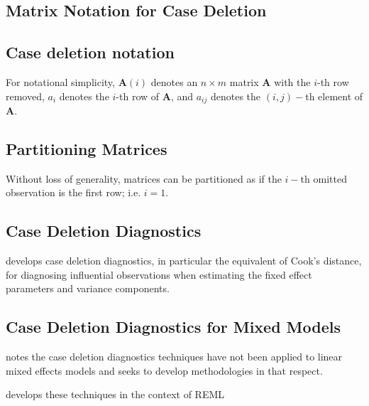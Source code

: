 \documentclass[Chap5amain.tex]{subfiles}
\begin{document}
\subsection{Matrix Notation for Case Deletion} %

\subsection{Case deletion notation} %

For notational simplicity, $\boldsymbol{A}(i)$ denotes an $n \times m$ matrix $\boldsymbol{A}$ with the $i$-th row
removed, $a_i$ denotes the $i$-th row of $\boldsymbol{A}$, and $a_{ij}$ denotes the $(i, j)-$th element of $\boldsymbol{A}$.

\subsection{Partitioning Matrices} %
Without loss of generality, matrices can be partitioned as if the $i-$th omitted observation is the first row; i.e. $i=1$.





\subsection{Case Deletion Diagnostics} %

\citet{CPJ} develops  case deletion diagnostics, in particular the equivalent of  Cook's distance, for diagnosing influential observations when estimating the fixed effect parameters and variance components.



\subsection{Case Deletion Diagnostics for Mixed Models}

\citet{Christiansen} notes the case deletion diagnostics techniques have not been applied to linear mixed effects models and seeks to develop methodologies in that respect.

\citet{Christiansen} develops these techniques in the context of REML
\end{document}
